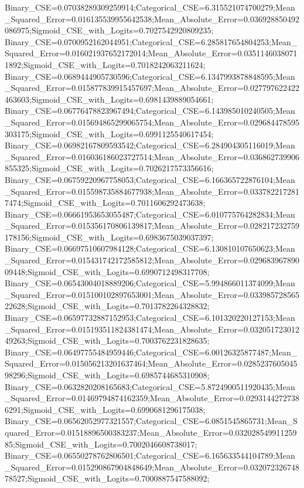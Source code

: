 Binary_CSE=0.07038289309259914;Categorical_CSE=6.315521074700279;Mean_Squared_Error=0.016135539955642538;Mean_Absolute_Error=0.036928850492086975;Sigmoid_CSE_with_Logits=0.7027542920809235;
Binary_CSE=0.0700952162044951;Categorical_CSE=6.285817654804253;Mean_Squared_Error=0.016021937652172014;Mean_Absolute_Error=0.03511460380711892;Sigmoid_CSE_with_Logits=0.7018242063211624;
Binary_CSE=0.0689444905730596;Categorical_CSE=6.1347993878848595;Mean_Squared_Error=0.015877839915457697;Mean_Absolute_Error=0.027797622422463603;Sigmoid_CSE_with_Logits=0.6981439889054661;
Binary_CSE=0.06776478823967494;Categorical_CSE=6.143985010240505;Mean_Squared_Error=0.015694865299065754;Mean_Absolute_Error=0.029684478595303175;Sigmoid_CSE_with_Logits=0.6991125540617454;
Binary_CSE=0.06982167809593542;Categorical_CSE=6.284904305116019;Mean_Squared_Error=0.016036186023727514;Mean_Absolute_Error=0.036862739906855325;Sigmoid_CSE_with_Logits=0.7026217573356616;
Binary_CSE=0.06759220967758053;Categorical_CSE=6.166365722876104;Mean_Squared_Error=0.015598735884677938;Mean_Absolute_Error=0.0337822172817474;Sigmoid_CSE_with_Logits=0.7011606292473638;
Binary_CSE=0.06661953653055487;Categorical_CSE=6.010775764282834;Mean_Squared_Error=0.015356170806139817;Mean_Absolute_Error=0.028217232759178156;Sigmoid_CSE_with_Logits=0.6983675039037397;
Binary_CSE=0.06697510607984128;Categorical_CSE=6.130810107650623;Mean_Squared_Error=0.015431742172585812;Mean_Absolute_Error=0.02968396789009448;Sigmoid_CSE_with_Logits=0.6990712498317708;
Binary_CSE=0.06543004018889206;Categorical_CSE=5.994866011374099;Mean_Squared_Error=0.015100102897653001;Mean_Absolute_Error=0.03398572856522628;Sigmoid_CSE_with_Logits=0.7013782264328832;
Binary_CSE=0.06597732887152953;Categorical_CSE=6.101320220127153;Mean_Squared_Error=0.015193511824381474;Mean_Absolute_Error=0.03205172301249263;Sigmoid_CSE_with_Logits=0.7003762231828635;
Binary_CSE=0.06497755484959446;Categorical_CSE=6.00126325877487;Mean_Squared_Error=0.015056213201637464;Mean_Absolute_Error=0.028523760504598296;Sigmoid_CSE_with_Logits=0.6985744685310908;
Binary_CSE=0.0632820208165683;Categorical_CSE=5.8724900511920435;Mean_Squared_Error=0.01469794874162359;Mean_Absolute_Error=0.02931442727386291;Sigmoid_CSE_with_Logits=0.6990681296175038;
Binary_CSE=0.06562052977321557;Categorical_CSE=6.0851545865731;Mean_Squared_Error=0.01518896500383237;Mean_Absolute_Error=0.03202854991125985;Sigmoid_CSE_with_Logits=0.7002046608738017;
Binary_CSE=0.06550278762806501;Categorical_CSE=6.165633544104789;Mean_Squared_Error=0.015290867904848649;Mean_Absolute_Error=0.03207232674878527;Sigmoid_CSE_with_Logits=0.7000887547588092;
